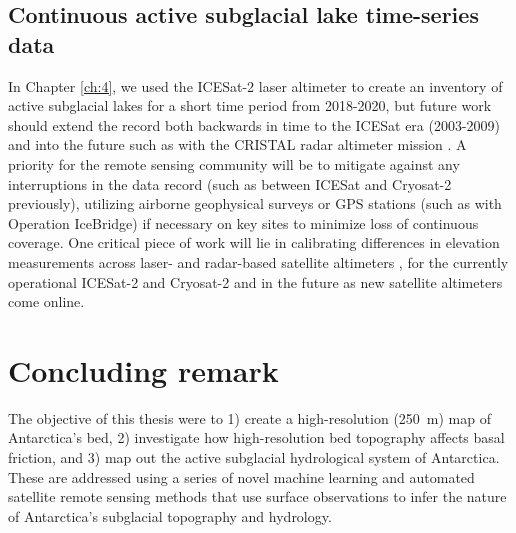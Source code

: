 \subsection{Continuous active subglacial lake time-series data}

In Chapter \ref{ch:4}, we used the ICESat-2 laser altimeter to create an inventory of active subglacial lakes for a short time period from 2018-2020, but future work should extend the record both backwards in time to the ICESat era (2003-2009) and into the future such as with the CRISTAL radar altimeter mission \citep{KernCopernicusPolarIce2020}.
A priority for the remote sensing community will be to mitigate against any interruptions in the data record (such as between ICESat and Cryosat-2 previously), utilizing airborne geophysical surveys or GPS stations (such as with Operation IceBridge) if necessary on key sites to minimize loss of continuous coverage.
One critical piece of work will lie in calibrating differences in elevation measurements across laser- and radar-based satellite altimeters \citep[c.f.][]{SiegfriedThirteenyearssubglacial2018}, for the currently operational ICESat-2 and Cryosat-2 \citep{BruntComparisonsSatelliteAirborne2020} and in the future as new satellite altimeters come online.

\section{Concluding remark}

The objective of this thesis were to 1) create a high-resolution (\SI{250}{\metre}) map of Antarctica's bed, 2) investigate how high-resolution bed topography affects basal friction, and 3) map out the active subglacial hydrological system of Antarctica.
These are addressed using a series of novel machine learning and automated satellite remote sensing methods that use surface observations to infer the nature of Antarctica's subglacial topography and hydrology.
